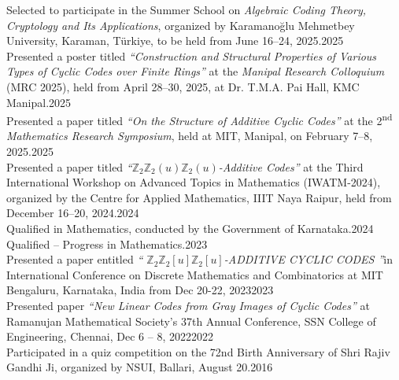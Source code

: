\documentclass[
	a4paper,
	sidecolor=gray!50,
	sectioncolor=materialblue,
	subsectioncolor=materialindigo,
	profilepicsize=3.5cm,
	profilepicstyle=profilecircle,
	profilepiczoom=1.1,
]{sixtysecondscv}
\begin{document}
\begin{cvtable}
{Selected to participate in the Summer School on \textit{Algebraic Coding Theory, Cryptology and Its Applications}, organized by Karamanoğlu Mehmetbey University, Karaman, Türkiye, to be held from June 16–24, 2025.}{2025}\\

{Presented a poster titled \textit{“Construction and Structural Properties of Various Types of Cyclic Codes over Finite Rings”} at the \textit{Manipal Research Colloquium} (MRC 2025), held from April 28–30, 2025, at Dr. T.M.A. Pai Hall, KMC Manipal.}{2025}\\

{Presented a paper titled \textit{“On the Structure of Additive Cyclic Codes”} at the 2\textsuperscript{nd} \textit{Mathematics Research Symposium}, held at MIT, Manipal, on February 7–8, 2025.}{2025}\\


{Presented a paper titled \textit{“\(\mathbb{Z}_2\mathbb{Z}_2(u)\mathbb{Z}_2(u)\)-Additive Codes”} at the Third International Workshop on Advanced Topics in Mathematics (IWATM-2024), organized by the Centre for Applied Mathematics, IIIT Naya Raipur, held from December 16–20, 2024.}{2024}\\


{Qualified in Mathematics, conducted by the Government of Karnataka.}{2024}\\




		{Qualified -- Progress in Mathematics.}{2023}\\

{Presented a paper entitled \textit{“ \(\mathbb{Z}_2\mathbb{Z}_2[u]\mathbb{Z}_2[u]\)-ADDITIVE CYCLIC CODES ”}in International Conference on Discrete Mathematics and Combinatorics at MIT Bengaluru, Karnataka, India from Dec 20-22, 2023}{2023}\\

        {Presented paper  \textit{“New Linear Codes from Gray Images of Cyclic Codes”} at Ramanujan Mathematical Society's 37th Annual Conference, SSN College of Engineering, Chennai, Dec 6 -- 8, 2022}{2022}\\

{Participated in a quiz competition on the 72nd Birth Anniversary of Shri Rajiv Gandhi Ji, organized by NSUI, Ballari, August 20.}{2016}        
\end{cvtable}
\end{document}
